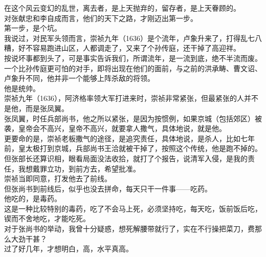\begin{multicols}{\theparacolNo}
在这个风云变幻的乱世，离去者，是上天抛弃的，留存者，是上天眷顾的。\\

对张献忠和李自成而言，他们的天下之路，才刚迈出第一步。\\

第一步，是个坑。\\

我说过，对民军头领而言，崇祯九年（1636）是个流年，卢象升来了，打得乱七八糟，好不容易跑进山区，人都调走了，又来了个孙传庭，还干掉了高迎祥。\\

按说坏事都到头了，可是事实告诉我们，所谓流年，是一流到底，绝不半流而废。\\

一个比孙传庭更可怕的对手，即将出现在他们的面前，与之前的洪承畴、曹文诏、卢象升不同，他并非一个能够上阵杀敌的将领。\\

他是统帅。\\

崇祯九年（1636），阿济格率领大军打进来时，崇祯非常紧张，但最紧张的人并不是他，而是张凤翼。\\

张凤翼，时任兵部尚书，他之所以紧张，是因为按惯例，如果京城（包括郊区）被袭，皇帝会不高兴，皇帝不高兴，就要拿人撒气，具体地说，就是他。\\

更要命的是，崇祯老板撒气的途径，是追究责任，具体地说，是杀人，比如七年前，皇太极打到京城，兵部尚书王洽就被干掉了，按照这个传统，他是跑不掉的。\\

但张部长还算识相，眼看局面没法收拾，就打了个报告，说清军入侵，是我的责任，我想戴罪立功，到前方去，希望批准。\\

崇祯当即同意，打发他去了前线。\\

但张尚书到前线后，似乎也没去拼命，每天只干一件事——吃药。\\

他吃的，是毒药。\\

这是一种比较特别的毒药，吃了不会马上死，必须坚持吃，每天吃，饭前饭后吃，锲而不舍地吃，才能吃死。\\

对于张尚书的举动，我曾十分疑惑，想死解腰带就行了，实在不行操把菜刀，费那么大劲干甚？\\

过了好几年，才想明白，高，水平真高。\\


\end{multicols}
